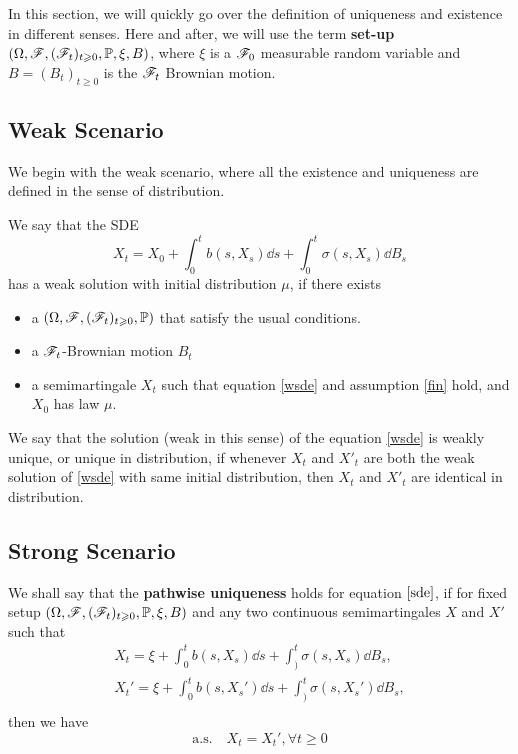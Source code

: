 \documentclass[8pt,onesided]{article}
\begin{document}
In this section, we will quickly go over the definition of uniqueness and existence in different senses. Here and after, we will use the term \textbf{set-up} $(\Omega, \mathscr{F} ,(\mathscr{F}_t)_{t\geqslant 0},\mathbb{P}, \xi, B)$, where $\xi$ is a $\mathscr{F}_0$ measurable random variable and $B=(B_t)_{t\ge 0}$ is the $\mathscr{F}_t$ Brownian motion.

\subsection{Weak Scenario}

We begin with the weak scenario, where all the existence and uniqueness are defined in the sense of distribution.

\begin{definition} 
 We say that the SDE
\begin{equation}
    \label{wsde}
    X_t=X_0+\int_0^t b(s,X_s) \dd s+\int_0^t \sigma(s,X_s) \dd B_s
\end{equation}
has a weak solution with initial distribution $\mu$, if there exists
\begin{itemize}
    \item a $(\Omega, \mathscr{F} ,(\mathscr{F}_t)_{t\geqslant 0},\mathbb{P})$ that satisfy the usual conditions.
    \item a $\mathscr{F}_t$-Brownian motion $B_t$ 
    \item a semimartingale $X_t$ such that equation \ref{wsde} and assumption \ref{fin} hold, and $X_0$ has law $\mu$.
\end{itemize}
\end{definition}

\begin{definition}
 We say that the solution (weak in this sense) of the equation \ref{wsde} is weakly unique, or unique in distribution, if whenever $X_t$ and $X'_t$ are both the weak solution of \ref{wsde} with same initial distribution, then $X_t$ and $X'_t$ are identical in distribution.
\end{definition}

\subsection{Strong Scenario}

\begin{definition}
 We shall say that the \textbf{pathwise uniqueness} holds for equation $\ref{sde}$, if for fixed setup $(\Omega, \mathscr{F} ,(\mathscr{F}_t)_{t\geqslant 0},\mathbb{P}, \xi, B)$ and any two continuous semimartingales $X$ and $X'$ such that
\begin{align*}
X_t=\xi+\int_0^t b(s,X_s)\dd s+\int_)^t \sigma(s, X_s)\dd B_s,\\
X_t'=\xi+\int_0^t b(s,X_s')\dd s+\int_)^t \sigma(s, X_s')\dd B_s,\\
\end{align*}
then we have
\begin{equation*}
    \text{a.s.}\quad  X_t=X_t', \forall t\ge 0
\end{equation*}
\end{definition}
\end{document}
